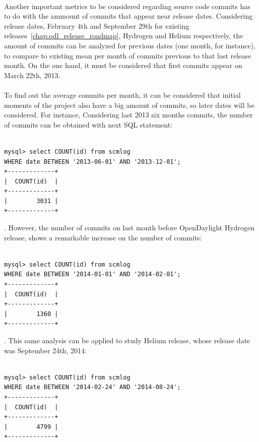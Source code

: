 \documentclass[a4paper, 12pt]{book}
\begin{document}
\\
Another important metrics to be considered regarding source code commits has to do with the ammount of commits that appear near release dates. Considering release dates, February 4th and September 29th for existing releases~\ref{chap:odl_release_roadmap}, Hydrogen and Helium respectively, the amount of commits can be analyzed for previous dates (one month, for instance), to compare to existing mean per month of commits previous to that last release month. On the one hand, it must be considered that first commits appear on March 22th, 2013.\\
\\
To find out the average commits per month, it can be considered that initial moments of the project also have a big amount of commits, so later dates will be considered. For instance, Considering last 2013 six months commits, the number of commits can be obtained with next SQL statement:

\begin{verbatim}

mysql> select COUNT(id) from scmlog
WHERE date BETWEEN '2013-06-01' AND '2013-12-01';
+-------------+
|  COUNT(id)  |
+-------------+
|        3031 |
+-------------+

\end{verbatim}

. However, the number of commits on last month before OpenDaylight Hydrogen release, shows a remarkable increase on the number of commits:

\begin{verbatim}

mysql> select COUNT(id) from scmlog
WHERE date BETWEEN '2014-01-01' AND '2014-02-01';
+-------------+
|  COUNT(id)  |
+-------------+
|        1360 |
+-------------+

\end{verbatim}
. This same analysis can be applied to study Helium release, whose release date was September 24th, 2014:

\begin{verbatim}

mysql> select COUNT(id) from scmlog
WHERE date BETWEEN '2014-02-24' AND '2014-08-24';
+-------------+
|  COUNT(id)  |
+-------------+
|        4799 |
+-------------+

\end{verbatim}
\end{document}
